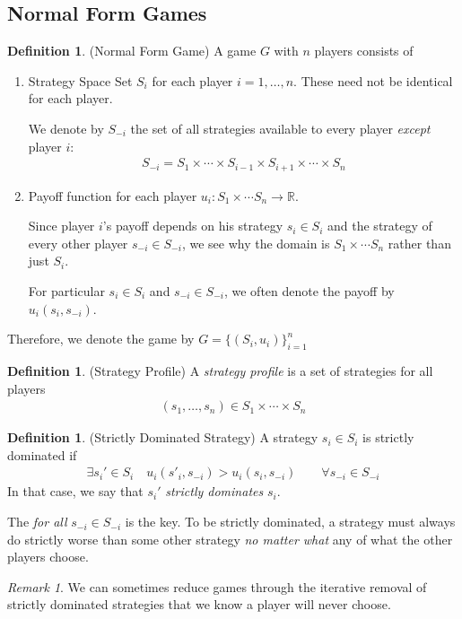 \documentclass[12pt]{article}
\theoremstyle{plain}
\theoremstyle{definition}
\newtheorem{defn}[thm]{Definition}
\theoremstyle{remark}
\newtheorem*{rmk}{Remark}
\newcommand{\ra}{\rightarrow}
\newcommand{\R}{\mathbb{R}}
\begin{document}
\clearpage
\subsection{Normal Form Games}

\begin{defn}(Normal Form Game)
A game $G$ with $n$ players consists of
\begin{enumerate}
  \item Strategy Space Set $S_i$ for each player $i=1,\ldots,n$.
    These need not be identical for each player.

    We denote by $S_{-i}$ the set of all strategies available
    to every player \emph{except} player $i$:
    \begin{align*}
      S_{-i}
      =S_1\times\cdots\times S_{i-1} \times S_{i+1} \times\cdots \times S_n
    \end{align*}
  \item Payoff function for each player $u_i:S_1\times\cdots S_n\ra \R$.

    Since player $i$'s payoff depends on his strategy $s_i\in S_i$ and
    the strategy of every other player $s_{-i}\in S_{-i}$, we see why
    the domain is $S_1\times\cdots S_n$ rather than just $S_i$.

    For particular $s_i\in S_i$ and $s_{-i}\in S_{-i}$, we often denote
    the payoff by $u_i(s_i,s_{-i})$.
\end{enumerate}
Therefore, we denote the game by $G=\{(S_i,u_i)\}^n_{i=1}$
\end{defn}

\begin{defn}(Strategy Profile)
A \emph{strategy profile} is a set of strategies for all players
\begin{align*}
  (s_1,\ldots,s_n) \in S_1 \times \cdots \times S_n
\end{align*}
\end{defn}


\begin{defn}(Strictly Dominated Strategy)
A strategy $s_i\in S_i$ is strictly dominated if
\begin{align*}
  \exists s_i' \in S_i
  \quad
  u_i(s'_i,s_{-i})
  >
  u_i(s_i,s_{-i})
  \qquad \forall s_{-i}\in S_{-i}
\end{align*}
In that case, we say that $s_i'$ \emph{strictly dominates} $s_i$.

The \emph{for all} $s_{-i}\in S_{-i}$ is the key. To be strictly
dominated, a strategy must always do strictly worse than some other
strategy \emph{no matter what} any of what the other players choose.
\end{defn}
\begin{rmk}
We can sometimes reduce games through the iterative removal of strictly
dominated strategies that we know a player will never choose.
\end{rmk}
\end{document}
